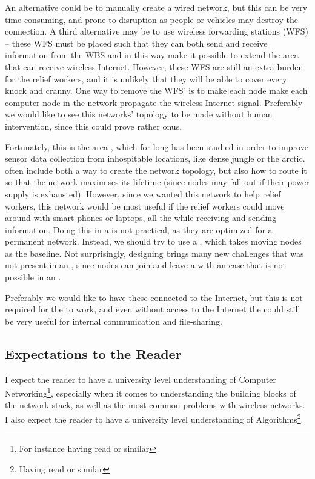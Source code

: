 An alternative could be to manually create a wired network, but this can be very time consuming, and prone to disruption as people or vehicles may destroy the connection. A third alternative may be to use wireless forwarding stations (WFS) -- these WFS must be placed such that they can both send and receive information from the WBS and in this way  make it possible to extend the area that can receive wireless Internet. However, these WFS are still an extra burden for the relief workers, and it is unlikely that they will be able to cover every knock and cranny. One way to remove the WFS' is to make each node make each computer node in the network propagate the wireless Internet signal. Preferably we would like to see this networks' topology to be made without human intervention, since this could prove rather onus. 

Fortunately, this is the area \anet, which for long has been studied in order to improve sensor data collection from inhospitable locations, like dense jungle or the arctic. \anet often include both  a way to create the network topology, but also how to route it so that the network maximises its lifetime (since nodes may fall out if their power supply is exhausted). However, since we wanted this network to help relief workers, this network would be most useful if the relief workers could move around with smart-phones or laptops, all the while receiving and sending information. Doing this in a \anet is not practical, as they are optimized for a permanent network. Instead, we should try to use a \manet, which takes moving nodes as the baseline. Not surprisingly, designing \manet brings many new challenges that was not present in an \anet, since nodes can join and leave a \manet with an ease that is not possible in an \anet.  

Preferably we would like to have these \manet connected to the Internet, but this is not required for the \manet to work, and even without access to the Internet the \manet could still  be very useful for internal communication and file-sharing. 
 

\subsection{Expectations to the Reader}
I expect the reader to have a university level understanding of Computer Networking\footnote{For instance having read \cite{ComNet} or similar}, especially when it comes to understanding the building blocks of the network stack, as well as the most common problems with wireless networks. I also expect the reader to have a university level understanding of Algorithms\footnote{Having read \cite{algo} or similar}. 

